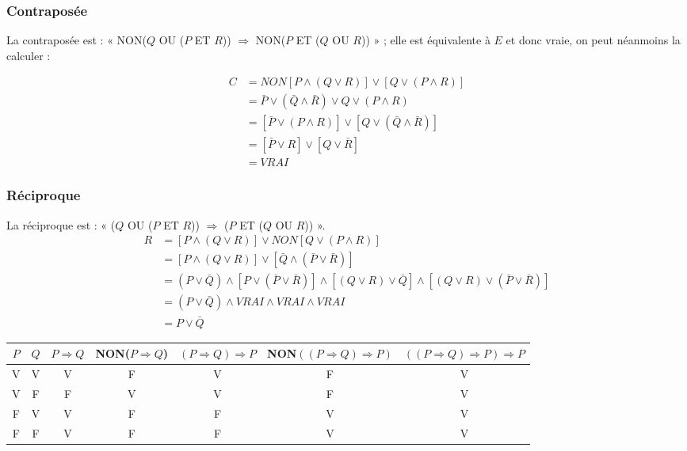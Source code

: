 \documentclass[a4paper,10pt]{report}
\begin{document}
\subsubsection*{Contraposée}
La contraposée est : « NON($Q$ OU ($P$ ET $R$)) $\Longrightarrow$ NON($P$ ET ($Q$ OU $R$)) » ;
elle est équivalente à $E$ et donc vraie, on peut néanmoins la calculer :

\begin{equation*}
	\begin{split}
	  C &= NON[P \wedge (Q \vee R)] \vee [Q \vee (P \wedge R)] \\
		&= \bar{P} \vee (\bar{Q} \wedge \bar{R}) \vee Q \vee (P \wedge R) \\
		&= [\bar{P} \vee (P \wedge R)] \vee [Q \vee (\bar{Q} \wedge \bar{R})] \\
		&= [\bar{P} \vee R] \vee [Q \vee \bar{R}] \\
		&= VRAI
	\end{split}
\end{equation*}


\subsubsection*{Réciproque}
La réciproque est : « ($Q$ OU ($P$ ET $R$)) $\Longrightarrow$ ($P$ ET ($Q$ OU $R$)) ».
\begin{equation*}
	\begin{split}
		R &= [P \wedge (Q \vee R)] \vee NON[Q \vee (P \wedge R)] \\
		  &= [P \wedge (Q \vee R)] \vee [\bar{Q} \wedge (\bar{P} \vee \bar{R})] \\
		  &= (P \vee \bar{Q}) \wedge [P \vee (\bar{P} \vee \bar{R})] \wedge [(Q \vee R) \vee \bar{Q}] \wedge [(Q \vee R) \vee (\bar{P} \vee \bar{R})]\\
		  &= (P \vee \bar{Q}) \wedge VRAI \wedge VRAI \wedge VRAI \\
		  &= P \vee \bar{Q}
	\end{split}
\end{equation*}

\begin{tabular}{|c|c|c|c|c|c|c|}
	\hline
	$P$ &  $Q$ & $P \Rightarrow Q$ & NON($P \Rightarrow Q$) & $(P \Rightarrow Q) \Rightarrow P$ & NON$((P \Rightarrow Q) \Rightarrow P)$ & $((P \Rightarrow Q) \Rightarrow P) \Rightarrow P$  \\
	\hline
	V   &  V   & V                 & F                      & V                                 &  F &  V\\
	\hline
	V   &  F   & F                 & V                      & V                                 &  F &  V\\
	\hline
	F   &  V   & V                 & F                      & F                                 &  V &  V\\
	\hline
	F   &  F   & V                 & F                      & F                                 &  V &  V\\
	\hline
\end{tabular}
\end{document}
